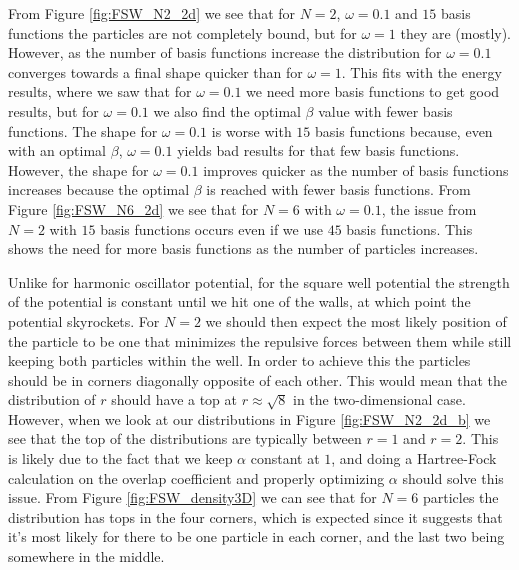 \documentclass[../main.tex]{subfiles}
\begin{document}
From Figure \ref{fig:FSW_N2_2d} we see that for $N=2$, $\omega = 0.1$ and $15$ basis functions the particles are not completely bound, but for $\omega = 1$ they are (mostly). However, as the number of basis functions increase the distribution for $\omega = 0.1$ converges towards a final shape quicker than for $\omega = 1$. This fits with the energy results, where we saw that for $\omega = 0.1$ we need more basis functions to get good results, but for $\omega = 0.1$ we also find the optimal $\beta$ value with fewer basis functions. The shape for $\omega = 0.1$ is worse with $15$ basis functions because, even with an optimal $\beta$, $\omega = 0.1$ yields bad results for that few basis functions. However, the shape for $\omega = 0.1$ improves quicker as the number of basis functions increases because the optimal $\beta$ is reached with fewer basis functions. From Figure \ref{fig:FSW_N6_2d} we see that for $N=6$ with $\omega = 0.1$, the issue from $N=2$ with $15$ basis functions occurs even if we use $45$ basis functions. This shows the need for more basis functions as the number of particles increases.

Unlike for harmonic oscillator potential, for the square well potential the strength of the potential is constant until we hit one of the walls, at which point the potential skyrockets. For $N=2$ we should then expect the most likely position of the particle to be one that minimizes the repulsive forces between them while still keeping both particles within the well. In order to achieve this the particles should be in corners diagonally opposite of each other. This would mean that the distribution of $r$ should have a top at $r \approx \sqrt{8}$ in the two-dimensional case. However, when we look at our distributions in Figure \ref{fig:FSW_N2_2d_b} we see that the top of the distributions are typically between $r=1$ and $r=2$. This is likely due to the fact that we keep $\alpha$ constant at $1$, and doing a Hartree-Fock calculation on the overlap coefficient and properly optimizing $\alpha$ should solve this issue. From Figure \ref{fig:FSW_density3D} we can see that for $N=6$ particles the distribution has tops in the four corners, which is expected since it suggests that it's most likely for there to be one particle in each corner, and the last two being somewhere in the middle.
\end{document}
